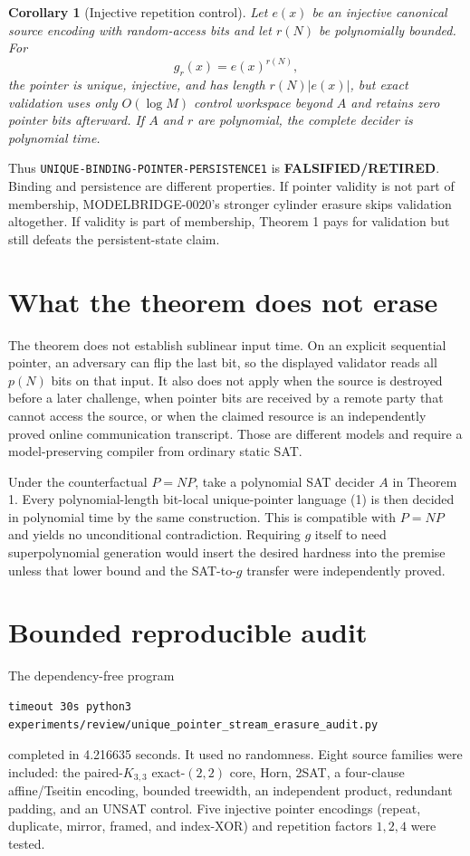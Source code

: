 \documentclass[11pt]{article}
\newtheorem{corollary}{Corollary}
\newcommand{\RETIRED}{\textbf{FALSIFIED/RETIRED}}
\begin{document}
\begin{corollary}[Injective repetition control]
Let $e(x)$ be an injective canonical source encoding with random-access bits
and let $r(N)$ be polynomially bounded.  For
\[
 g_r(x)=e(x)^{r(N)},
 \tag{4}
\]
the pointer is unique, injective, and has length $r(N)|e(x)|$, but exact
validation uses only $O(\log M)$ control workspace beyond $A$ and retains zero
pointer bits afterward.  If $A$ and $r$ are polynomial, the complete decider
is polynomial time.
\end{corollary}

Thus \texttt{UNIQUE-BINDING-POINTER-PERSISTENCE1} is
\RETIRED.  Binding and persistence are different properties.  If pointer
validity is not part of membership, MODELBRIDGE-0020's stronger cylinder
erasure skips validation altogether.  If validity is part of membership,
Theorem 1 pays for validation but still defeats the persistent-state claim.

\section{What the theorem does not erase}

The theorem does not establish sublinear input time.  On an explicit
sequential pointer, an adversary can flip the last bit, so the displayed
validator reads all $p(N)$ bits on that input.  It also does not apply when
the source is destroyed before a later challenge, when pointer bits are
received by a remote party that cannot access the source, or when the claimed
resource is an independently proved online communication transcript.  Those
are different models and require a model-preserving compiler from ordinary
static SAT.

Under the counterfactual $P=NP$, take a polynomial SAT decider $A$ in
Theorem 1.  Every polynomial-length bit-local unique-pointer language (1) is
then decided in polynomial time by the same construction.  This is compatible
with $P=NP$ and yields no unconditional contradiction.  Requiring $g$ itself
to need superpolynomial generation would insert the desired hardness into the
premise unless that lower bound and the SAT-to-$g$ transfer were independently
proved.

\section{Bounded reproducible audit}

The dependency-free program
\begin{verbatim}
timeout 30s python3 experiments/review/unique_pointer_stream_erasure_audit.py
\end{verbatim}
completed in 4.216635 seconds.  It used no randomness.  Eight source families
were included: the paired-$K_{3,3}$ exact-$(2,2)$ core, Horn, 2SAT, a
four-clause affine/Tseitin encoding, bounded treewidth, an independent
product, redundant padding, and an UNSAT control.  Five injective pointer
encodings (repeat, duplicate, mirror, framed, and index-XOR) and repetition
factors $1,2,4$ were tested.
\end{document}
